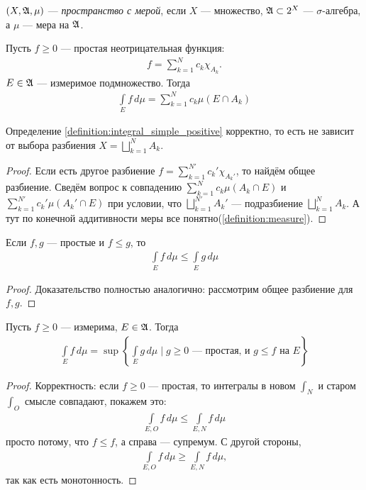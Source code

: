 \begin{df}
 $(X, \mathfrak{A}, \mu)$ --- \textit{пространство с мерой}, если $X$ --- множество, $\mathfrak{A} \subset 2^{X}$ --- $\sigma$-алгебра, а $\mu$ --- мера на $\mathfrak{A}$.
\end{df}
\begin{df}
 \label{definition:integral_simple_positive}
 Пусть $f \geqslant 0$ --- простая неотрицательная функция: \begin{align*}
  f = \sum_{k=1}^{N} c_k \chi_{A_k}
 .\end{align*}  $E \in \mathfrak{A}$ --- измеримое подмножество.  Тогда \begin{align*}
  \int\limits_{E} f \, d\mu = \sum_{k=1}^{N} c_k \mu (E \cap A_k)
 \end{align*} 
\end{df}
\begin{remrk}
 Определение \ref{definition:integral_simple_positive} корректно, то есть не зависит от выбора разбиения $X = \bigsqcup_{k=1}^{N} A_k$.
\end{remrk}
\begin{proof}
	Если есть другое разбиение $f = \sum_{k=1}^{N'} c_k' \chi_{A_k'}$, то найдём общее разбиение.
	Сведём вопрос к совпадению $\sum_{k=1}^{N} c_k \mu (A_k \cap E)$ и $\sum_{k=1}^{N'} c_k' \mu (A_k' \cap E)$ при условии, что $\bigsqcup_{k=1}^{N'} A_k' $ --- подразбиение $\bigsqcup_{k=1}^{N} A_k$.
	А тут по конечной аддитивности меры все понятно(\ref{definition:measure}).
\end{proof}
\begin{remrk}
 Если $f,g$ --- простые и $f \leqslant g$, то \begin{align*}
  \int\limits_E f \, d\mu \leqslant \int\limits_E g\, d\mu
 \end{align*} 
\end{remrk}
\begin{proof}
 Доказательство полностью аналогично: рассмотрим общее разбиение для $f,g$.
\end{proof}
\begin{df}
	\label{definition:integral_supremum_simple}
 Пусть $f \geqslant 0$ --- измерима, $E \in \mathfrak{A}$. Тогда \begin{align*}
  \int\limits_E f \, d\mu = \sup \left\{ \int\limits_E g\, d\mu \mid g \geqslant 0 \text{ --- простая, и } g \leqslant f \text{ на } E \right\}
 \end{align*} 
\end{df}
\begin{proof}
 Корректность: если $f \geqslant 0$ --- простая, то интегралы в новом $\int_N$ и старом $\int_O$ смысле совпадают, покажем это:
 \begin{align*}
  \int\limits_{E,O} f \, d\mu \leqslant \int\limits_{E,N} f \, d\mu
 \end{align*} просто потому, что $f \leqslant f$, а справа --- супремум. С другой стороны, \begin{align*}
  \int\limits_{E,O} f \, d\mu \geqslant \int\limits_{E,N} f \, d\mu
,\end{align*} так как есть монотонность.
\end{proof}
